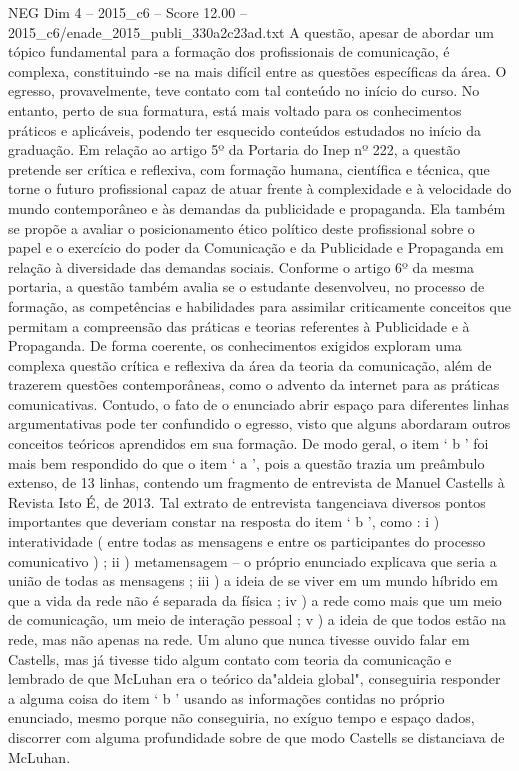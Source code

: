 \begin{textsample}{NEG Dim 4 – 2015\_c6 – Score 12.00 – 2015\_c6/enade\_2015\_publi\_330a2c23ad.txt}
A questão, apesar de abordar um tópico fundamental para a formação dos profissionais de comunicação, é complexa, constituindo -se na mais difícil entre as questões específicas da área.
O egresso, provavelmente, teve contato com tal conteúdo no início do curso.
No entanto, perto de sua formatura, está mais voltado para os conhecimentos práticos e aplicáveis, podendo ter esquecido conteúdos estudados no início da graduação.
Em relação ao artigo 5º da Portaria do Inep nº 222, a questão pretende ser crítica e reflexiva, com formação humana, científica e técnica, que torne o futuro profissional capaz de atuar frente à complexidade e à velocidade do mundo contemporâneo e às demandas da publicidade e propaganda.
Ela também se propõe a avaliar o posicionamento ético político deste profissional sobre o papel e o exercício do poder da Comunicação e da Publicidade e Propaganda em relação à diversidade das demandas sociais.
Conforme o artigo 6º da mesma portaria, a questão também avalia se o estudante desenvolveu, no processo de formação, as competências e habilidades para assimilar criticamente conceitos que permitam a compreensão das práticas e teorias referentes à Publicidade e à Propaganda.
De forma coerente, os conhecimentos exigidos exploram uma complexa questão crítica e reflexiva da área da teoria da comunicação, além de trazerem questões contemporâneas, como o advento da internet para as práticas comunicativas.
Contudo, o fato de o enunciado abrir espaço para diferentes linhas argumentativas pode ter confundido o egresso, visto que alguns abordaram outros conceitos teóricos aprendidos em sua formação.
De modo geral, o item ‘ b ’ foi mais bem respondido do que o item ‘ a ’, pois a questão trazia um preâmbulo extenso, de 13 linhas, contendo um fragmento de entrevista de Manuel Castells à Revista Isto É, de 2013.
Tal extrato de entrevista tangenciava diversos pontos importantes que deveriam constar na resposta do item ‘ b ’, como : i ) interatividade ( entre todas as mensagens e entre os participantes do processo comunicativo ) ; ii ) metamensagem – o próprio enunciado explicava que seria a união de todas as mensagens ; iii ) a ideia de se viver em um mundo híbrido em que a vida da rede não é separada da física ; iv ) a rede como mais que um meio de comunicação, um meio de interação pessoal ; v ) a ideia de que todos estão na rede, mas não apenas na rede.
Um aluno que nunca tivesse ouvido falar em Castells, mas já tivesse tido algum contato com teoria da comunicação e lembrado de que McLuhan era o teórico da"aldeia global", conseguiria responder a alguma coisa do item ‘ b ’ usando as informações contidas no próprio enunciado, mesmo porque não conseguiria, no exíguo tempo e espaço dados, discorrer com alguma profundidade sobre de que modo Castells se distanciava de McLuhan.

\end{textsample}
